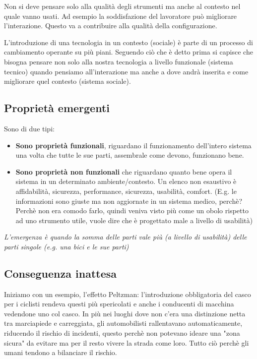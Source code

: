 \documentclass[11pt,a4paper]{book}
\begin{document}
Non si deve pensare solo alla qualità degli strumenti ma anche al contesto nel quale vanno usati. Ad esempio la soddisfazione del lavoratore può migliorare l'interazione. Questo va a contribuire alla qualità della configurazione. 

L'introduzione di una tecnologia in un contesto (sociale) è parte di un processo di cambiamento operante su più piani. Seguendo ciò che è detto prima si capisce che bisogna pensare non solo alla nostra tecnologia a livello funzionale (sistema tecnico) quando pensiamo all'interazione ma anche a dove andrà inserita e come migliorare quel contesto (sistema sociale).
 
\subsection{Proprietà emergenti}
Sono di due tipi:
\begin{itemize}
	\item \textbf{Sono proprietà funzionali}, riguardano il funzionamento dell'intero sistema una volta che tutte le sue parti, assembrale come devono, funzionano bene.
	\item \textbf{Sono proprietà non funzionali} che riguardano quanto bene opera il sistema in un determinato ambiente/contesto. Un elenco non esaustivo è affidabilità, sicurezza, performance, sicurezza, usabilità, comfort. (E.g. le informazioni sono giuste ma non aggiornate in un sistema medico, perchè? Perchè non era comodo farlo, quindi veniva visto più come un obolo rispetto ad uno strumento utile, vuole dire che è progettato male a livello di usabilità)
\end{itemize}

\begin{center}
	\textit{L'emergenza è quando la somma delle parti vale più (a livello di usabilità) delle parti singole (e.g. una bici e le sue parti)}
\end{center}

\subsection{Conseguenza inattesa}
Iniziamo con un esempio, l'effetto Peltzman: l'introduzione obbligatoria del casco per i ciclisti rendeva questi più spericolati e anche i conducenti di macchina vedendone uno col casco. In più nei luoghi dove non c'era una distinzione netta tra marciapiede e carreggiata, gli automobilisti rallentavano automaticamente, riducendo il rischio di incidenti, questo perchè non potevano ideare una "zona sicura" da evitare ma per il resto vivere la strada come loro. Tutto ciò perchè gli umani tendono a bilanciare il rischio.
\end{document}
